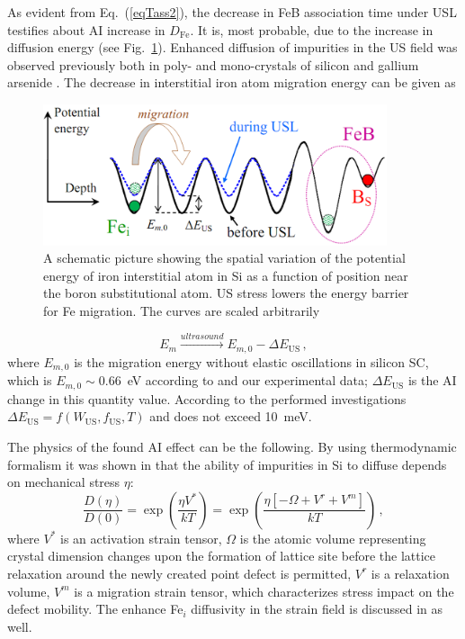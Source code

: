 \documentclass[sn-mathphys]{sn-jnl}%
\theoremstyle{thmstyleone}%
\theoremstyle{thmstyletwo}%
\theoremstyle{thmstylethree}%
\begin{document}
As evident from Eq.~(\ref{eqTass2}), the decrease in FeB association time under USL testifies about
AI increase in $D_\mathrm{Fe}$.
It is, most probable, due to the increase in diffusion energy (see Fig.~\ref{figUSChem}).
Enhanced diffusion of impurities in the US field was observed previously
both in poly- and mono-crystals of silicon and gallium arsenide \cite{Ostapenko1999,Zaveryukhin2002}.
The decrease in interstitial iron atom migration energy can be given as
\begin{figure}
\centering
 \includegraphics[width=0.9\textwidth]{Fig7}
\caption{
A schematic picture showing the spatial variation of the potential energy of
iron interstitial atom in Si as a function of position near the boron substitutional atom.
US stress lowers the energy barrier for Fe migration.
The curves are scaled arbitrarily
}
\label{figUSChem}       %
\end{figure}

\begin{equation}
\label{eqEmUs}
E_m \xrightarrow{ultrasound} E_{m,0}-\Delta E_\mathrm{US}\,,
\end{equation}
where $E_{m,0}$ is the migration energy without elastic oscillations in silicon SC,
which is $E_{m,0}\sim0.66$~eV according to \cite{FeBAssJAP2014,FeBkinAPL2008} and our experimental data;
$\Delta E_\mathrm{US}$ is the AI change in this quantity value.
According to the performed investigations  $\Delta E_\mathrm{US}=f(W_\mathrm{US},f_\mathrm{US},T)$ and does not exceed 10~meV.

The physics of the found AI effect can be the following.
By using thermodynamic formalism it was shown in \cite{AZIZ2001} that the ability of
impurities in Si to diffuse depends on mechanical stress $\eta$:
\begin{equation}
\label{eqTeor}
\frac{D(\eta)}{D(0)}=\exp\left(\frac{\eta V^*}{kT}\right)=
\exp\left(\frac{\eta [-\Omega+V^r+V^m]}{kT}\right)\,,
\end{equation}
where
$V^*$ is an activation strain tensor,
$\Omega$ is the atomic volume representing  crystal dimension changes
upon the formation of lattice site before the lattice relaxation
around the newly created point defect is permitted,
$V^r$ is a relaxation volume,
$V^m$ is a migration strain tensor, which characterizes stress impact on the defect mobility.
The enhance Fe$_i$ diffusivity in the strain field is discussed in \cite{FeStrain} as well.
\end{document}
